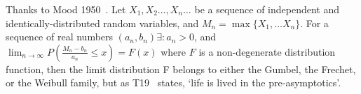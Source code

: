 
Thanks to Mood 1950~\cite{mood1950introduction}.
Let $X_{1}, X_{2} \ldots, X_{n} \ldots$ be a sequence of independent and
identically-distributed random variables, and $M_n = \max\{X_1, \ldots X_n\}$.
For a sequence of real numbers $(a_n, b_n) \exists: a_n>0$, and
$\lim _{n \rightarrow \infty} P\left(\frac{M_{n}-b_{n}}{a_{n}} \leq x\right)=F(x)$
where $F$ is a non-degenerate distribution function, then the limit distribution
F belongs to either the Gumbel, the Frechet, or the Weibull family,
but as T19~\cite{taleb2019statistical} states, `life is lived in the pre-asymptotics'.
